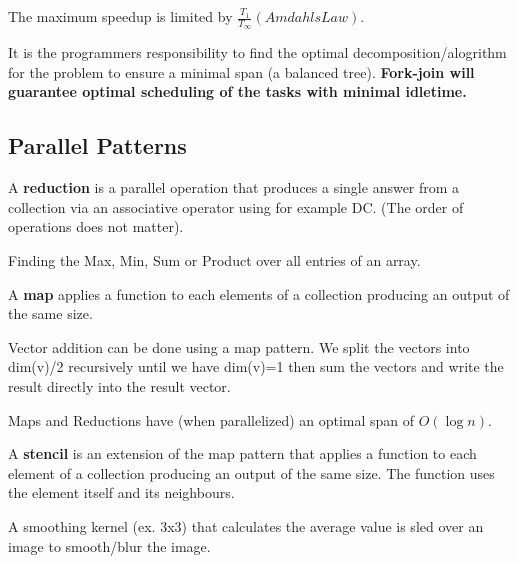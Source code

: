 \begin{remark}
    The maximum speedup is limited by $\frac{T_1}{T_{\infty}} (Amdahls Law)$.
\end{remark}



It is the programmers responsibility to find the optimal decomposition/alogrithm for the problem to ensure a
minimal span (a balanced tree). \textbf{Fork-join will guarantee optimal scheduling of the tasks with minimal idletime.}


\subsection{Parallel Patterns}

\begin{definition}
    A \textbf{reduction} is a parallel operation that produces a single answer from a collection via an
    associative operator using for example DC. (The order of operations does not matter).
\end{definition}

\begin{example}
    Finding the Max, Min, Sum or Product over all entries of an array.  
\end{example}

\begin{definition}
    A \textbf{map} applies a function to each elements of a collection producing an output of the same size.
\end{definition}

\begin{example}
    Vector addition can be done using a map pattern. We split the vectors into dim(v)/2 recursively
    until we have dim(v)=1 then sum the vectors and write the result directly into the result vector.
\end{example}

\begin{remark}
    Maps and Reductions have (when parallelized) an optimal span of $O(\log n)$.
\end{remark}

\begin{definition}
    A \textbf{stencil} is an extension of the map pattern that applies a function to each element of a collection producing an output of the same size. The function uses the element itself and its neighbours.
\end{definition}

\begin{example}
    A smoothing kernel (ex. 3x3) that calculates the average value is sled over an image to smooth/blur the image.
\end{example}

